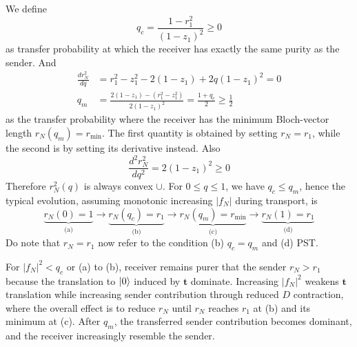 \documentclass[../../../main.tex]{subfiles}
\begin{document}
We define
\begin{equation*}
  q_c= \frac{1-r_1^2}{(1-z_1)^2}\geq 0
\end{equation*}
as transfer probability at which the receiver has exactly the same purity as the sender.
And
\begin{align*}
  \frac{d r_N^2}{dq}
      & =  r_1^2-z_1^2-2(1-z_1) + 2q(1-z_1)^2 =0 \\
  q_m & =
  \frac{ 2(1-z_1)-(r_1^2-z_1^2) }{ 2(1-z_1)^2 } = \frac{1+q_c }{2} \geq \frac{1 }{2}
\end{align*}
as the transfer probability where the receiver has the minimum Bloch-vector length $r_N(q_m) = r_\text{min}$.
The first quantity is obtained by setting $r_N=r_1$, while the second is by setting its derivative instead.
Also
\begin{equation*}
  \frac{d^2 r_N^2}{dq^2} = 2(1-z_1)^2\ge0
\end{equation*}
Therefore \(r_N^2(q)\) is always convex $\cup$.
For $0\leq q \leq1$, we have $q_c\leq q_m$, hence the typical evolution, assuming monotonic increasing $|f_N|$ during transport, is
\begin{equation*}
  \underbrace{r_N(0)=1}_{\text{(a)}} \longrightarrow
  \underbrace{r_N(q_c)=r_1}_{\text{(b)}} \longrightarrow
  \underbrace{r_N(q_m)=r_{\min}}_\text{(c)} \longrightarrow
  \underbrace{r_N(1)=r_1}_\text{(d)}
\end{equation*}
Do note that $r_N=r_1$ now refer to the condition (b) $q_c=q_m$ and (d) PST.

For $|f_N|^2<q_c$ or (a) to (b), receiver remains purer that the sender $r_N>r_1$ because the translation to $\ket{0}$ induced by $\mathbf{t}$ dominate.
Increasing $|f_N|^2$ weakens  $\mathbf{t}$ translation while  increasing sender contribution through reduced $D$ contraction, where the overall effect is to reduce $r_N$ until $r_N$ reaches $r_1$ at (b) and its minimum at (c).
After $q_m$, the transferred sender contribution becomes dominant, and the receiver increasingly resemble the sender.
\end{document}
